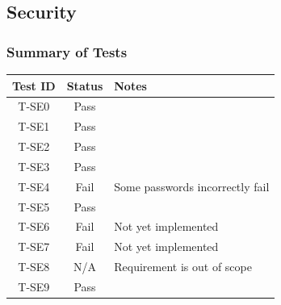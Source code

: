 \documentclass[12pt, titlepage]{article}
\begin{document}
\subsection{Security}
\subsubsection{Summary of Tests}
\begin{center}
    \begin{tabular}{|c|c|l|}
        \hline
        \textbf{Test ID} & \textbf{Status} & \textbf{Notes}\\
        \hline
        T-SE0 & Pass & \\
        T-SE1 & Pass & \\ 
        T-SE2 & Pass & \\ 
        T-SE3 & Pass & \\ 
        T-SE4 & Fail & Some passwords incorrectly fail\\ 
        T-SE5 & Pass & \\ 
        T-SE6 & Fail & Not yet implemented\\ 
        T-SE7 & Fail & Not yet implemented\\ 
        T-SE8 & N/A & Requirement is out of scope\\ 
        T-SE9 & Pass & \\ 
        \hline
    \end{tabular}
\end{center}
\end{document}
